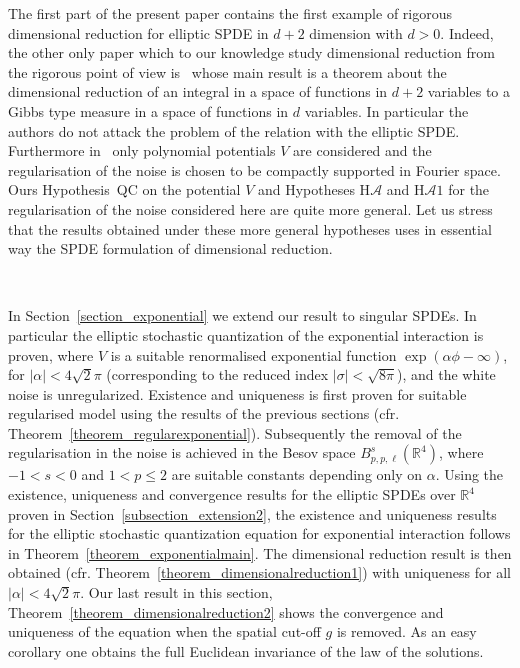 \documentclass[a4paper,10pt]{article}
\begin{document}
The first part of the present paper contains the first example of rigorous
dimensional reduction for elliptic SPDE in $d + 2$ dimension with $d > 0$.
Indeed, the other only paper which to our knowledge study dimensional
reduction from the rigorous point of view is~{\cite{Klein1984}} whose main
result is a theorem about the dimensional reduction of an integral in a space
of functions in $d + 2$ variables to a Gibbs type measure in a space of
functions in $d$ variables. In particular the authors do not attack the
problem of the relation with the elliptic SPDE. Furthermore
in~{\cite{Klein1984}} only polynomial potentials $V$ are considered and the
regularisation of the noise is chosen to be compactly supported in Fourier
space. Ours Hypothesis~QC on the potential $V$ and Hypotheses H$\mathcal{A}$
and H$\mathcal{A} 1$ for the regularisation of the noise considered here are
quite more general. Let us stress that the results obtained under these more
general hypotheses uses in essential way the SPDE formulation of dimensional
reduction.

\

In Section~\ref{section_exponential} we extend our result to singular SPDEs.
In particular the elliptic stochastic quantization of the exponential
interaction is proven, where $V$ is a suitable renormalised exponential
function $\exp (\alpha \phi - \infty)$, for $| \alpha | < 4 \sqrt{2} \pi$
(corresponding to the reduced index $| \sigma | < \sqrt{8 \pi}$), and the
white noise is unregularized. Existence and uniqueness is first proven for
suitable regularised model using the results of the previous sections (cfr.
Theorem~\ref{theorem_regularexponential}). Subsequently the removal of the
regularisation in the noise is achieved in the Besov space $B^s_{p, p, \ell}
(\mathbb{R}^4)$, where $- 1 < s < 0$ and $1 < p \leqslant 2$ are suitable
constants depending only on $\alpha$. Using the existence, uniqueness and
convergence results for the elliptic SPDEs over $\mathbb{R}^4$ proven in
Section~\ref{subsection_extension2}, the existence and uniqueness results for
the elliptic stochastic quantization equation for exponential interaction
follows in Theorem~\ref{theorem_exponentialmain}. The dimensional reduction
result is then obtained (cfr. Theorem~\ref{theorem_dimensionalreduction1})
with uniqueness for all $| \alpha | < 4 \sqrt{2} \pi$. Our last result in this
section, Theorem~\ref{theorem_dimensionalreduction2} shows the convergence and
uniqueness of the equation when the spatial cut-off $g$ is removed. As an easy
corollary one obtains the full Euclidean invariance of the law of the
solutions.
\end{document}
